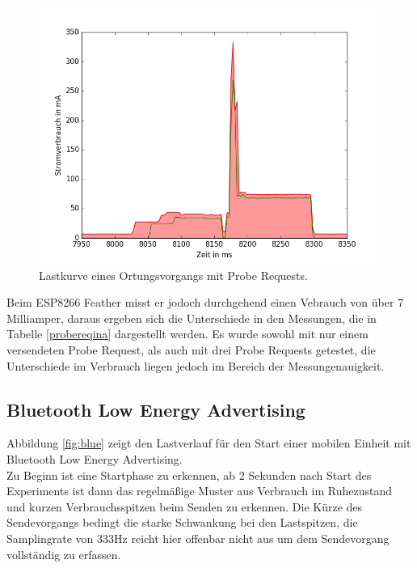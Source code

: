 \begin{figure}[h!]
  \centering
	\includegraphics[width=\textwidth]{plots/probereqv.png}
  \caption{Lastkurve eines Ortungsvorgangs mit Probe Requests.}
  \label{fig:probereqv}
\end{figure}

Beim ESP8266 Feather misst er jodoch durchgehend einen Vebrauch von über 7 Milliamper, daraus ergeben sich die Unterschiede in den Messungen, die in Tabelle \ref{probereqina} dargestellt werden.
Es wurde sowohl mit nur einem versendeten Probe Request, als auch mit drei Probe Requests getestet, die Unterschiede im Verbrauch liegen jedoch im Bereich der Messungenauigkeit.

\subsection{Bluetooth Low Energy Advertising}
\label{ch:realworld:sec:ble}
Abbildung \ref{fig:blue} zeigt den Lastverlauf für den Start einer mobilen Einheit mit Bluetooth Low Energy Advertising.\\
Zu Beginn ist eine Startphase zu erkennen, ab 2 Sekunden nach Start des Experiments ist dann das regelmäßige Muster aus Verbrauch im Ruhezustand und kurzen Verbrauchsspitzen beim Senden zu erkennen.
Die Kürze des Sendevorgangs bedingt die starke Schwankung bei den Lastspitzen, die Samplingrate von 333Hz reicht hier offenbar nicht aus um dem Sendevorgang vollständig zu erfassen.\\


